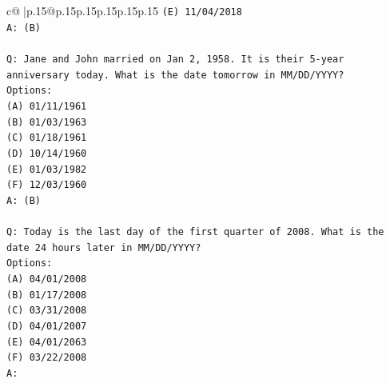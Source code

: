 \documentclass{article}
\begin{document}
{\begin{supertabular}{c@{$\;$}|p{.15\linewidth}@{}p{.15\linewidth}p{.15\linewidth}p{.15\linewidth}p{.15\linewidth}p{.15\linewidth}}
{{{\texttt{(E) 11/04/2018} \\
\texttt{A: (B)} \\
\\ 
\texttt{Q: Jane and John married on Jan 2, 1958. It is their 5{-}year anniversary today. What is the date tomorrow in MM/DD/YYYY?} \\
\texttt{Options:} \\
\texttt{(A) 01/11/1961} \\
\texttt{(B) 01/03/1963} \\
\texttt{(C) 01/18/1961} \\
\texttt{(D) 10/14/1960} \\
\texttt{(E) 01/03/1982} \\
\texttt{(F) 12/03/1960} \\
\texttt{A: (B)} \\
\\ 
\texttt{Q: Today is the last day of the first quarter of 2008. What is the date 24 hours later in MM/DD/YYYY?} \\
\texttt{Options:} \\
\texttt{(A) 04/01/2008} \\
\texttt{(B) 01/17/2008} \\
\texttt{(C) 03/31/2008} \\
\texttt{(D) 04/01/2007} \\
\texttt{(E) 04/01/2063} \\
\texttt{(F) 03/22/2008} \\
\texttt{A:} \\
            }
        }
    }
     \\ \\


\end{supertabular}}
\end{document}
